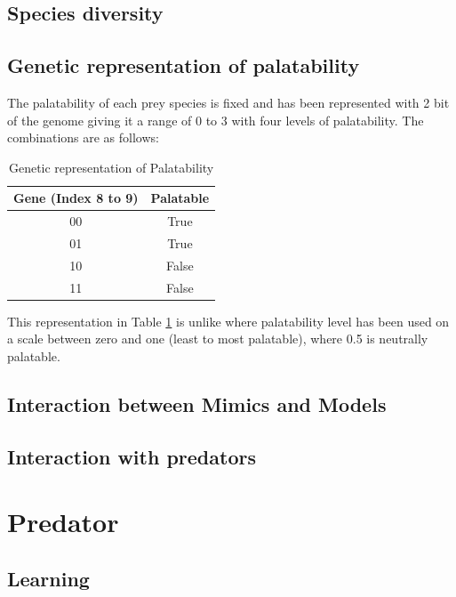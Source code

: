 \subsection{Species diversity}

\subsection{Genetic representation of palatability}
The palatability of each prey species is fixed and has been represented with 2 bit of the genome giving it a range of 0 to 3 with four levels of palatability. The combinations are as follows:

\begin{table}[H]
	\centering
	\begin{tabular}{|c|c|}
		\hline
			Gene (Index 8 to 9) &	Palatable \\ \hline
			00									& True 			\\ \hline
			01									& True 			\\ \hline
			10									& False 		\\ \hline
			11									& False 		\\
		\hline
	\end{tabular}
	\caption{Genetic representation of Palatability}
	\label{tab:genetic-representation-palatability}
\end{table}

This representation in Table \ref{tab:genetic-representation-palatability} is unlike \cite{franks2003} where palatability level has been used on a scale between zero and one (least to most palatable), where 0.5 is neutrally palatable. 

\subsection{Interaction between Mimics and Models}

\subsection{Interaction with predators}

\section{Predator}

\subsection{Learning}

